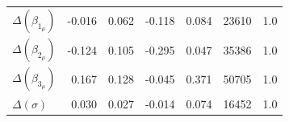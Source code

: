 \documentclass[doc,biblatex]{apa7}
\begin{document}
\begin{table}[h]
\begin{center}
\begin{threeparttable}
\begin{tabular}{lrrrrrr}
$\Delta(\beta_{1_\mu})$  & -0.016 &  0.062 &  -0.118 &    0.084 &   23610 &    1.0 \\
$\Delta(\beta_{2_\mu})$  & -0.124 &  0.105 &  -0.295 &    0.047 &   35386 &    1.0 \\
$\Delta(\beta_{3_\mu})$  &  0.167 &  0.128 &  -0.045 &    0.371 &   50705 &    1.0 \\
$\Delta(σ)$              &  0.030 &  0.027 &  -0.014 &    0.074 &   16452 &    1.0 \\
\bottomrule
\end{tabular}
\label{exp2_parameter_estimates}
\end{threeparttable}
\end{center}
\end{table}
\end{document}
